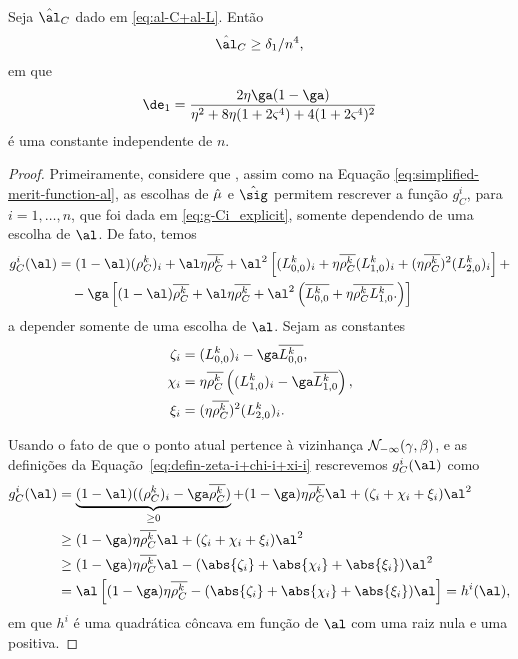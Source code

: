 \begin{lema}\label{lemma:alC_delta-1}
Seja $\nextal_{C}$ dado em \eqref{eq:al-C+al-L}. Então  
\[
\nextal_{C} \geq \delta_{1}/n^{4},
\]
em que 
\begin{equation}
	\label{eq:delta1}
	\de_{1} = \dfrac{2\eta\ga(1-\ga)}{\eta^{2} + 8\eta (1+2\bdxzstar^{4}) + 4 (1+2\bdxzstar^{4})^{2}   }
\end{equation}
é uma constante independente de $n$.
\end{lema}

\begin{proof}
 Primeiramente, considere que , assim como na Equação \eqref{eq:simplified-merit-function-al}, as escolhas de $\hat{\mu}$ e $\nextsig$ permitem rescrever a função $g_C^i $, para $i=1,\ldots,n$, que foi dada em \eqref{eq:g-Ci_explicit}, somente dependendo de uma escolha de $\al$. De fato, temos
\[
\begin{aligned}
{g}_C^i (\al)				& = (1-\al)(\rho_C^k )_i+ \al\eta\rhoCkb + \al^2\left[(L_{0,0}^{k})_i + \eta\rhoCkb  ({L_{1,0}^{k}})_i 
				+ (\eta\rhoCkb )^2(L_{2,0}^{k})_i \right]  + \\
				& \quad -\ga\left[  (1-\al)\rhoCkb  + \al\eta\rhoCkb  + \al^2\left(\dbvec{L_{0,0}^{k}} + \eta\rhoCkb  \dbvec{L_{1,0}^{k}}.
\right)  \right]
\end{aligned}
\]
a depender somente de uma escolha de $\al$.
Sejam as constantes
\begin{equation}
\label{eq:defin-zeta-i+chi-i+xi-i}
	\begin{aligned}
\zeta_i & = (L_{0,0}^{k})_i - \ga \dbvec{L_{0,0}^{k}}, \\
\chi_i  & = \eta\rhoCkb  \left( ({L_{1,0}^{k}})_i - \ga\dbvec{L_{1,0}^{k}} \right),   \\
\xi_i	& =  (\eta\rhoCkb )^2(L_{2,0}^{k})_i . \\ 	
\end{aligned}
\end{equation}



Usando o fato de que o ponto atual pertence à vizinhança $\mathcal{N}_{-\infty}(\gamma,\beta)$, e as definições da Equação~\eqref{eq:defin-zeta-i+chi-i+xi-i} rescrevemos  $g_C^i(\al) $ como
\[
\begin{aligned}
	g_C^i (\al) & = \underbrace{(1-\al)((\rho_C^k )_i - \ga\rhoCkb )}_{\geq 0}  + (1-\ga)\eta\rhoCkb  \al+  (\zeta_i + 				\chi_i + \xi_i)\al^2  \\
				& \geq (1-\ga)\eta\rhoCkb  \al +  (\zeta_i + 				\chi_i + \xi_i)\al^2 \\ 
				& \geq (1-\ga)\eta\rhoCkb  \al -  (\abs{\zeta_i} + \abs{\chi_i} + \abs{\xi_i})\al^2 \\
				& = \al \left[	(1-\ga)\eta\rhoCkb   -  (\abs{\zeta_i} + \abs{\chi_i} + \abs{\xi_i})\al	\right] = h^i(\al),
\end{aligned}
\]
em que $h^i$ é uma quadrática côncava em função de $\al$ com uma raiz nula e uma positiva. 



\end{proof}
